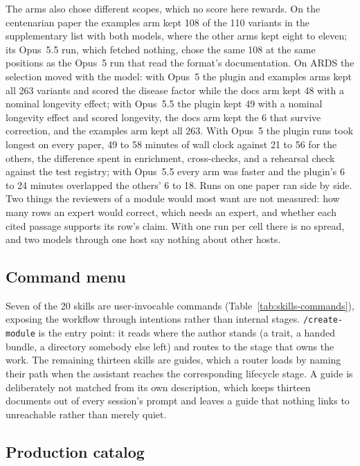 \documentclass[11pt,a4paper]{article}
\begin{document}
The arms also chose different scopes, which no score here rewards. On the
centenarian paper the examples arm kept 108 of the 110 variants in the
supplementary list with both models, where the other arms kept eight to
eleven; its Opus~5.5 run, which fetched nothing, chose the
same 108 at the same positions as the Opus~5 run that read the format's
documentation. On ARDS the selection moved with the model: with Opus~5 the
plugin and examples arms kept all 263 variants and scored the disease factor
while the docs arm kept 48 with a nominal longevity effect; with Opus~5.5 the
plugin kept 49 with a nominal longevity effect and scored longevity, the docs arm kept the 6 that
survive correction, and the examples arm kept all 263. With Opus~5 the plugin
runs took longest on every paper, 49 to 58 minutes of wall clock against 21 to
56 for the others, the difference spent in enrichment, cross-checks, and a
rehearsal check against the test registry; with Opus~5.5 every arm was faster
and the plugin's 6 to 24 minutes overlapped the others' 6 to 18. Runs on one
paper ran side by side. Two things the reviewers of a module would most want
are not measured: how many rows an expert would correct, which needs an
expert, and whether each cited passage supports its row's claim. With one run
per cell there is no spread, and two models through one host say nothing about
other hosts.

\subsection{Command menu}

Seven of the 20 skills are user-invocable commands (Table~\ref{tab:skills-commands}),
exposing the workflow through intentions rather than internal stages.
\texttt{/create-module} is the entry point: it reads where the author
stands (a trait, a handed bundle, a directory somebody else
left) and routes to the stage that owns the work. The remaining thirteen
skills are guides, which a router loads by naming their path when
the assistant reaches the corresponding lifecycle stage. A guide is
deliberately not matched from its own description, which keeps thirteen
documents out of every session's prompt and leaves a guide that nothing links to
unreachable rather than merely quiet.

\subsection{Production catalog}
\end{document}
